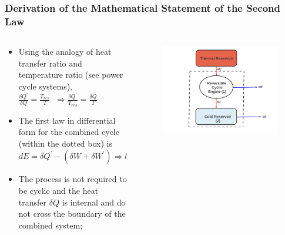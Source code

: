 \documentclass[10pt,compress,handout,ignorenonframetext]{beamer}
\begin{document}
\begin{frame}
 \frametitle{Derivation of the Mathematical Statement of the Second Law}
 \begin{columns}

  \begin{column}[c]{0.55\linewidth}
   \begin{itemize}
    \item <1-> Using the analogy of heat transfer ratio and temperature ratio (see power cycle systems), \\
                $\displaystyle\frac{\delta Q^{\prime}}{\delta Q} = \displaystyle\frac{T_{res}}{T} \;\; \Longrightarrow \displaystyle\frac{\delta Q^{\prime}}{T_{res}} = \displaystyle\frac{\delta Q}{T}$
  \item <2-> The first law in differential form for the combined cycle (within the dotted box) is \\
                $dE= \delta Q^{\prime} - \left(\delta W + \delta W^{\prime}\right) \Longrightarrow \delta W + \delta W^{\prime} = \delta Q^{\prime} - dE$
  \item <3-> The process is not required to be cyclic and the heat transfer $\delta Q$ is internal and do not cross the boundary of the combined system;
   \end{itemize}


  \end{column}

  \begin{column}[c]{0.45\linewidth}
   \begin{figure}%
    \begin{center}
     \includegraphics[width=1.\columnwidth,clip]{./Pics/2ndLaw_Schem2}
    \end{center}
   \end{figure} 
  \end{column}
 \end{columns}


 \normalsize
    
\end{frame}
\end{document}
